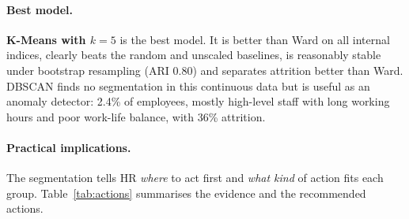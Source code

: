 \documentclass[12pt,a4paper]{article}
\begin{document}
\paragraph{Best model.} \textbf{K-Means with $k=5$} is the best model. It is
better than Ward on all internal indices, clearly beats the random and
unscaled baselines, is reasonably stable under bootstrap resampling (ARI 0.80)
and separates attrition better than Ward. DBSCAN finds no segmentation in this
continuous data but is useful as an anomaly detector: 2.4\% of employees,
mostly high-level staff with long working hours and poor work-life balance,
with 36\% attrition.

\paragraph{Practical implications.} The segmentation tells HR \emph{where}
to act first and \emph{what kind} of action fits each group.
Table~\ref{tab:actions} summarises the evidence and the recommended actions.
\end{document}
